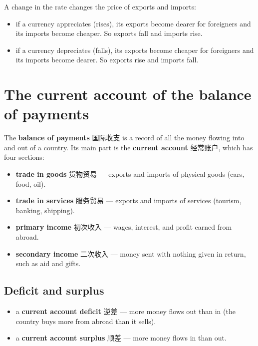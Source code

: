 \documentclass[11pt]{article}
\begin{document}
A change in the rate changes the price of exports and imports:

\begin{itemize}
\item if a currency appreciates (rises), its exports become dearer for foreigners and its imports become cheaper. So exports fall and imports rise.

\item if a currency depreciates (falls), its exports become cheaper for foreigners and its imports become dearer. So exports rise and imports fall.

\end{itemize}

\section*{The current account of the balance of payments}

The \textbf{balance of payments} 国际收支 is a record of all the money flowing into and out of a country. Its main part is the \textbf{current account} 经常账户, which has four sections:

\begin{itemize}
\item \textbf{trade in goods} 货物贸易 — exports and imports of physical goods (cars, food, oil).

\item \textbf{trade in services} 服务贸易 — exports and imports of services (tourism, banking, shipping).

\item \textbf{primary income} 初次收入 — wages, interest, and profit earned from abroad.

\item \textbf{secondary income} 二次收入 — money sent with nothing given in return, such as aid and gifts.

\end{itemize}

\subsection*{Deficit and surplus}

\begin{itemize}
\item a \textbf{current account deficit} 逆差 — more money flows out than in (the country buys more from abroad than it sells).

\item a \textbf{current account surplus} 顺差 — more money flows in than out.

\end{itemize}
\end{document}
